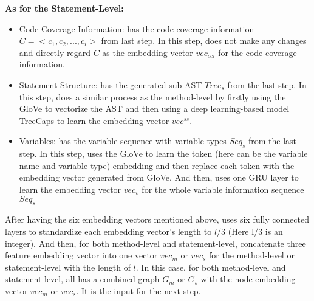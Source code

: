 {\bf As for the Statement-Level:}
\begin{itemize}
	\item Code Coverage Information: \tool has the code coverage information $C = <c_1, c_2, ..., c_i>$ from last step. In this step, \tool does not make any changes and directly regard $C$ as the embedding vector $vec_{cci}$ for the code coverage information.
	
	\item Statement Structure: \tool has the generated sub-AST $Tree_s$ from the last step. In this step, \tool does a similar process as the method-level by firstly using the GloVe to vectorize the AST and then using a deep learning-based model TreeCaps to learn the embedding vector $vec^{ss}$.
	
	\item Variables: \tool has the variable sequence with variable types $Seq_s$ from the last step. In this step, \tool uses the GloVe to learn the token (here can be the variable name and variable type) embedding and then replace each token with the embedding vector generated from GloVe. And then, \tool uses one GRU layer to learn the embedding vector $vec_{v}$ for the whole variable information sequence $Seq_s$
\end{itemize}

After having the six embedding vectors mentioned above, \tool uses six fully connected layers to standardize each embedding vector's length to $l/3$ (Here l/3 is an integer). And then, for both method-level and statement-level, \tool concatenate three feature embedding vector into one vector $vec_{m}$ or $vec_{s}$ for the method-level or statement-level with the length of $l$. In this case, for both method-level and statement-level, \tool all has a combined graph $G_m$ or $G_s$ with the node embedding vector $vec_{m}$ or $vec_{s}$. It is the input for the next step.